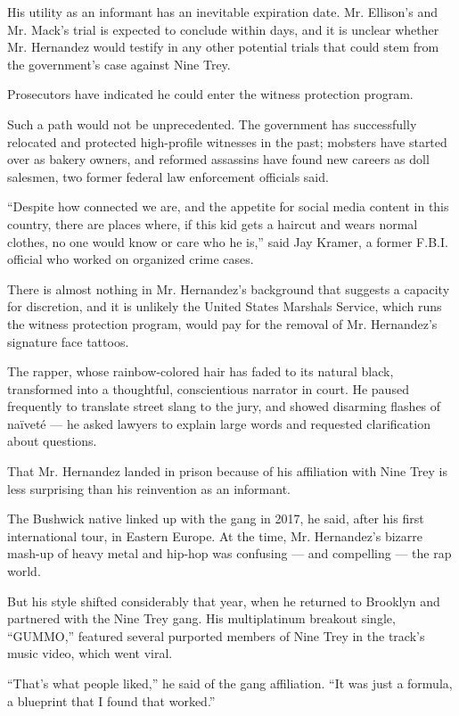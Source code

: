 His utility as an informant has an inevitable expiration date. Mr.
Ellison's and Mr. Mack's trial is expected to conclude within days, and
it is unclear whether Mr. Hernandez would testify in any other potential
trials that could stem from the government's case against Nine Trey.

Prosecutors have indicated he could enter the witness protection
program.

Such a path would not be unprecedented. The government has successfully
relocated and protected high-profile witnesses in the past; mobsters
have started over as bakery owners, and reformed assassins have found
new careers as doll salesmen, two former federal law enforcement
officials said.

``Despite how connected we are, and the appetite for social media
content in this country, there are places where, if this kid gets a
haircut and wears normal clothes, no one would know or care who he is,''
said Jay Kramer, a former F.B.I. official who worked on organized crime
cases.

There is almost nothing in Mr. Hernandez's background that suggests a
capacity for discretion, and it is unlikely the United States Marshals
Service, which runs the witness protection program, would pay for the
removal of Mr. Hernandez's signature face tattoos.

The rapper, whose rainbow-colored hair has faded to its natural black,
transformed into a thoughtful, conscientious narrator in court. He
paused frequently to translate street slang to the jury, and showed
disarming flashes of naïveté --- he asked lawyers to explain large words
and requested clarification about questions.

That Mr. Hernandez landed in prison because of his affiliation with Nine
Trey is less surprising than his reinvention as an informant.

The Bushwick native linked up with the gang in 2017, he said, after his
first international tour, in Eastern Europe. At the time, Mr.
Hernandez's bizarre mash-up of heavy metal and hip-hop was confusing ---
and compelling --- the rap world.

But his style shifted considerably that year, when he returned to
Brooklyn and partnered with the Nine Trey gang. His multiplatinum
breakout single, ``GUMMO,'' featured several purported members of Nine
Trey in the track's music video, which went viral.

``That's what people liked,'' he said of the gang affiliation. ``It was
just a formula, a blueprint that I found that worked.''


